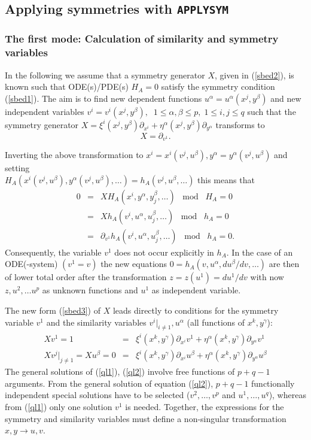 \subsection{Applying symmetries with \texttt{APPLYSYM}}
\subsubsection{The first mode: Calculation of similarity and symmetry variables}
In the following we assume that a symmetry generator $X$, given
in (\ref{sbed2}), is known such that ODE(s)/PDE(s) $H_A=0$
satisfy the symmetry condition (\ref{sbed1}). The aim is to
find new dependent functions $u^\alpha = u^\alpha(x^j,y^\beta)$ and
new independent variables $v^i = v^i(x^j,y^\beta),\;\;
1\leq\alpha,\beta\leq p,\;1\leq i,j \leq q$
such that the symmetry generator
$X = \xi^i(x^j,y^\beta)\partial_{x^i} +
     \eta^\alpha(x^j,y^\beta)\partial_{y^\alpha}$
transforms to
\begin{equation}
X = \partial_{v^1}.    \label{sbed3}
\end{equation}

Inverting the above transformation to $x^i=x^i(v^j,u^\beta),
y^\alpha=y^\alpha(v^j,u^\beta)$ and setting \\
$H_A(x^i(v^j,u^\beta), y^\alpha(v^j,u^\beta),\ldots) =
h_A(v^j, u^\beta,\ldots)$
this means that
\begin{eqnarray*}
 0 & = & X H_A(x^i,y^\alpha,y^\beta_j,\ldots)\;\;\; \mbox{mod} \;\;\; H_A=0 \\
   & = & X h_A(v^i,u^\alpha,u^\beta_j,\ldots)\;\;\; \mbox{mod} \;\;\; h_A=0 \\
   & = & \partial_{v^1}h_A(v^i,u^\alpha,u^\beta_j,\ldots)\;\;\; \mbox{mod}
         \;\;\; h_A=0.
\end{eqnarray*}
Consequently, the variable $v^1$ does not occur explicitly in $h_A$.
In the case of an ODE(-system) $(v^1=v)$
the new equations $0=h_A(v,u^\alpha,du^\beta/dv,\ldots)$
are then of lower total order
after the transformation $z = z(u^1) = du^1/dv$ with now $z, u^2,\ldots u^p$
as unknown functions and $u^1$ as independent variable.

The new form (\ref{sbed3}) of $X$ leads directly to conditions for the
symmetry variable $v^1$ and the similarity variables
$v^i|_{i\neq 1}, u^\alpha$ (all functions of $x^k,y^\gamma$):
\begin{eqnarray}
 X v^1 = 1 & = & \xi^i(x^k,y^\gamma)\partial_{x^i}v^1 +
                \eta^\alpha(x^k,y^\gamma)\partial_{y^\alpha}v^1 \label{ql1} \\
 X v^j|_{j\neq 1} = X u^\beta = 0 & = &
                 \xi^i(x^k,y^\gamma)\partial_{x^i}u^\beta +
                 \eta^\alpha(x^k,y^\gamma)\partial_{y^\alpha}u^\beta \label{ql2}
\end{eqnarray}
The general solutions of (\ref{ql1}), (\ref{ql2}) involve free functions
of $p+q-1$ arguments. From the general solution of equation (\ref{ql2}),
$p+q-1$ functionally independent special solutions have to be selected
($v^2,\ldots,v^p$ and $u^1,\ldots,u^q$), 
whereas from (\ref{ql1}) only one solution $v^1$ is needed.
Together, the expressions for the symmetry and similarity variables must
define a non-singular transformation $x,y \rightarrow u,v$.

